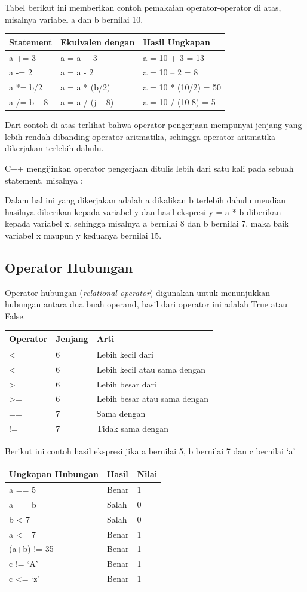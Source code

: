 Tabel berikut ini memberikan contoh pemakaian operator-operator di atas,
misalnya variabel a dan b bernilai 10.

\begin{longtable}[]{@{}lll@{}}
\toprule
Statement & Ekuivalen dengan & Hasil Ungkapan\tabularnewline
\midrule
\endhead
a += 3 & a = a + 3 & a = 10 + 3 = 13\tabularnewline
a -= 2 & a = a - 2 & a = 10 -- 2 = 8\tabularnewline
a *= b/2 & a = a * (b/2) & a = 10 * (10/2) = 50\tabularnewline
a /= b -- 8 & a = a / (j -- 8) & a = 10 / (10-8) = 5\tabularnewline
\bottomrule
\end{longtable}

Dari contoh di atas terlihat bahwa operator pengerjaan mempunyai jenjang
yang lebih rendah dibanding operator aritmatika, sehingga operator
aritmatika dikerjakan terlebih dahulu.

C++ mengijinkan operator pengerjaan ditulis lebih dari satu kali pada
sebuah statement, misalnya :



Dalam hal ini yang dikerjakan adalah a dikalikan b terlebih dahulu
meudian hasilnya diberikan kepada variabel y dan hasil ekspresi y = a *
b diberikan kepada variabel x. sehingga misalnya a bernilai 8 dan b
bernilai 7, maka baik variabel x maupun y keduanya bernilai 15.

\subsection{Operator Hubungan}\label{e-operator-hubungan}

Operator hubungan (\emph{relational operator}) digunakan untuk
menunjukkan hubungan antara dua buah operand, hasil dari operator ini
adalah True atau False.

\begin{longtable}[]{@{}lll@{}}
\toprule
Operator & Jenjang & Arti\tabularnewline
\midrule
\endhead
\textless{} & 6 & Lebih kecil dari\tabularnewline
\textless{}= & 6 & Lebih kecil atau sama dengan\tabularnewline
\textgreater{} & 6 & Lebih besar dari\tabularnewline
\textgreater{}= & 6 & Lebih besar atau sama dengan\tabularnewline
== & 7 & Sama dengan\tabularnewline
!= & 7 & Tidak sama dengan\tabularnewline
\bottomrule
\end{longtable}

Berikut ini contoh hasil ekspresi jika a bernilai 5, b bernilai 7 dan c
bernilai `a'

\begin{longtable}[]{@{}lll@{}}
\toprule
Ungkapan Hubungan & Hasil & Nilai\tabularnewline
\midrule
\endhead
a == 5 & Benar & 1\tabularnewline
a == b & Salah & 0\tabularnewline
b \textless{} 7 & Salah & 0\tabularnewline
a \textless{}= 7 & Benar & 1\tabularnewline
(a+b) != 35 & Benar & 1\tabularnewline
c != `A' & Benar & 1\tabularnewline
c \textless{}= `z' & Benar & 1\tabularnewline
\bottomrule
\end{longtable}

